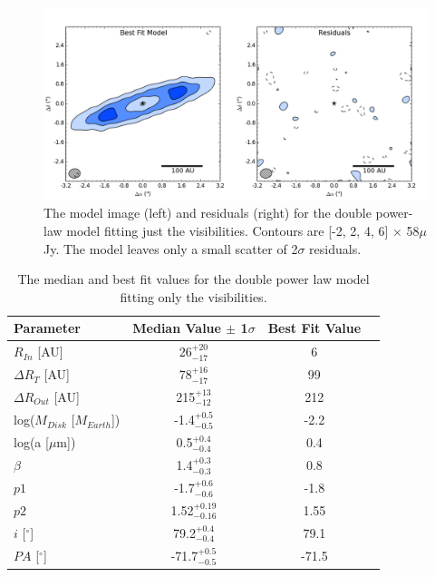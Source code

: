 {{\begin{figure}
\centering
\includegraphics[width = 1\textwidth]{49CET_DoublePowerVIS_ModelResidual.png}
\caption{The model image (left) and residuals (right) for the double power-law model fitting just the visibilities. Contours are [-2, 2, 4, 6] $\times$ 58$\mu$Jy. The model leaves only a small scatter of 2$\sigma$ residuals.}
\label{fig:49CET_DoublePowerVIS_ModelResidual}
\end{figure}

\begin{table}
\begin{center}
    \def\arraystretch{1.37}%
    \begin{tabular}{l*{2}{c}r}
    \hline
    Parameter & Median Value $\pm$ 1$\sigma$ & Best Fit Value \\ \hline
     $R_{In}$  [AU] & 26$^{+20}_{-17}$ & 6\\  
     $\Delta R_{T}$ [AU] & 78$^{+16}_{-17}$ & 99\\ 
     $\Delta R_{Out}$ [AU] & 215$^{+13}_{-12}$ & 212\\ 
     log($M_{Disk}$ [$M_{Earth}$]) & -1.4$^{+0.5}_{-0.5}$ & -2.2 \\
     log(a [$\mu$m]) & 0.5$^{+0.4}_{-0.4}$ & 0.4\\ 
     $\beta$ & 1.4$^{+0.3}_{-0.3}$ & 0.8\\ 
     $p1$ & -1.7$^{+0.6}_{-0.6}$ & -1.8\\ 
     $p2$ & 1.52$^{+0.19}_{-0.16}$ & 1.55\\ 
     $i$ [$^\circ$] & 79.2$^{+0.4}_{-0.4}$ & 79.1 \\ 
     $PA$ [$^\circ$] & -71.7$^{+0.5}_{-0.5}$ & -71.5\\
    \hline
    \end{tabular}
\end{center}
\caption{The median and best fit values for the double power law model fitting only the visibilities.}
\label{tab:49CET_DoublePowerVIS_Table}
\end{table}


}}

